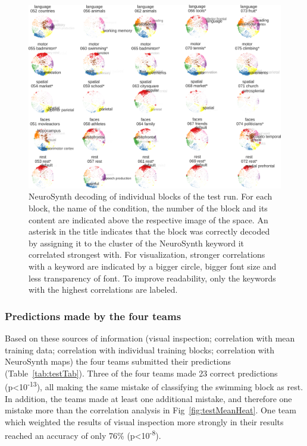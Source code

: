 \documentclass[fleqn,10pt]{SelfArx} %
\begin{document}
\begin{figure}[htbp]
	\begin{minipage}{\textwidth}
		\renewcommand{\familydefault}{\sfdefault}\normalfont
		\centering
		\includegraphics[width=\columnwidth]{./figs/fig9_nsSpacesTestMs.png}
				\vspace*{-3mm}
		\caption{NeuroSynth decoding of individual blocks of the test run. For each block, the name of the condition, the number of the block and its content are indicated above the respective image of the space. An asterisk in the title indicates that the block was correctly decoded by assigning it to the cluster of the NeuroSynth keyword it correlated strongest with. For visualization, stronger correlations with a keyword are indicated by a bigger circle, bigger font size and less transparency of font. To improve readability, only the keywords with the highest correlations are labeled.}%
		\label{fig:testNs}
	\end{minipage}
\end{figure}

\subsubsection*{Predictions made by the four teams}

Based on these sources of information (visual inspection; correlation with mean training data; correlation with individual training blocks; correlation with NeuroSynth maps) the four teams submitted their predictions (Table~\ref{tab:testTab}). Three of the four teams made 23 correct predictions (p<10\textsuperscript{-13}), all making the same mistake of classifying the swimming block as rest. In addition, the teams made at least one additional mistake, and therefore one mistake more than the correlation analysis in Fig~\ref{fig:testMeanHeat}. One team which weighted the results of visual inspection more strongly in their results reached an accuracy of only 76\% (p<10\textsuperscript{-8}).
\end{document}
